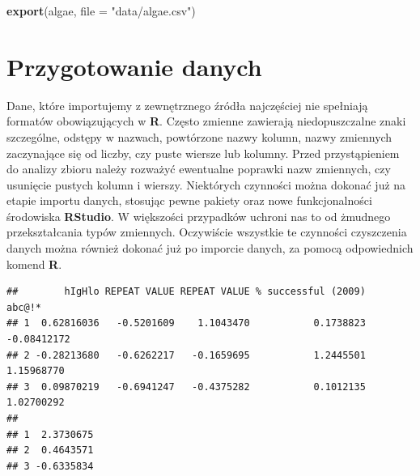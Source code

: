 \documentclass[]{book}
\newenvironment{Shaded}{\begin{snugshade}}{\end{snugshade}}
\newcommand{\CommentTok}[1]{\textcolor[rgb]{0.56,0.35,0.01}{\textit{#1}}}
\newcommand{\DataTypeTok}[1]{\textcolor[rgb]{0.13,0.29,0.53}{#1}}
\newcommand{\DecValTok}[1]{\textcolor[rgb]{0.00,0.00,0.81}{#1}}
\newcommand{\KeywordTok}[1]{\textcolor[rgb]{0.13,0.29,0.53}{\textbf{#1}}}
\newcommand{\NormalTok}[1]{#1}
\newcommand{\StringTok}[1]{\textcolor[rgb]{0.31,0.60,0.02}{#1}}
\theoremstyle{plain}
\theoremstyle{definition}
\theoremstyle{definition}
\theoremstyle{definition}
\theoremstyle{definition}
\theoremstyle{remark}
\begin{document}
\begin{Shaded}
\begin{Highlighting}[]
\KeywordTok{export}\NormalTok{(algae, }\DataTypeTok{file =} \StringTok{"data/algae.csv"}\NormalTok{)}
\end{Highlighting}
\end{Shaded}

\hypertarget{przygotowanie-danych}{%
\chapter{Przygotowanie danych}\label{przygotowanie-danych}}

Dane, które importujemy z zewnętrznego źródła najczęściej nie spełniają formatów obowiązujących w \textbf{R}. Często zmienne zawierają niedopuszczalne znaki szczególne, odstępy w nazwach, powtórzone nazwy kolumn, nazwy zmiennych zaczynające się od liczby, czy puste wiersze lub kolumny. Przed przystąpieniem do analizy zbioru należy rozważyć ewentualne poprawki nazw zmiennych, czy usunięcie pustych kolumn i wierszy. Niektórych czynności można dokonać już na etapie importu danych, stosując pewne pakiety oraz nowe funkcjonalności środowiska \textbf{RStudio}. W większości przypadków uchroni nas to od żmudnego przekształcania typów zmiennych. Oczywiście wszystkie te czynności czyszczenia danych można również dokonać już po imporcie danych, za pomocą odpowiednich komend \textbf{R}.

\begin{Shaded}
\end{Shaded}

\begin{verbatim}
##        hIgHlo REPEAT VALUE REPEAT VALUE % successful (2009)      abc@!*
## 1  0.62816036   -0.5201609    1.1043470           0.1738823 -0.08412172
## 2 -0.28213680   -0.6262217   -0.1659695           1.2445501  1.15968770
## 3  0.09870219   -0.6941247   -0.4375282           0.1012135  1.02700292
##             
## 1  2.3730675
## 2  0.4643571
## 3 -0.6335834
\end{verbatim}
\end{document}
